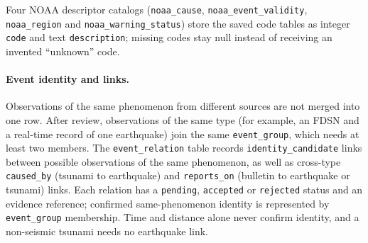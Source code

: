\documentclass[a4paper,11pt,oneside]{book}
\begin{document}
Four NOAA descriptor catalogs (\texttt{noaa\_cause}, \texttt{noaa\_event\_validity}, \texttt{noaa\_region} and \texttt{noaa\_warning\_status}) store the saved code tables as integer \texttt{code} and text \texttt{description}; missing codes stay null instead of receiving an invented ``unknown'' code.

\paragraph{Event identity and links.}
Observations of the same phenomenon from different sources are not merged into one row.
After review, observations of the same type (for example, an FDSN and a real-time record of one earthquake) join the same \texttt{event\_group}, which needs at least two members.
The \texttt{event\_relation} table records \texttt{identity\_candidate} links between possible observations of the same phenomenon, as well as cross-type \texttt{caused\_by} (tsunami to earthquake) and \texttt{reports\_on} (bulletin to earthquake or tsunami) links. Each relation has a \texttt{pending}, \texttt{accepted} or \texttt{rejected} status and an evidence reference; confirmed same-phenomenon identity is represented by \texttt{event\_group} membership.
Time and distance alone never confirm identity, and a non-seismic tsunami needs no earthquake link.
\end{document}
